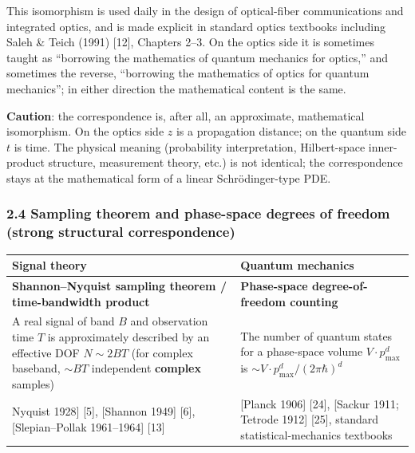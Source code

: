 \documentclass[
]{article}
\newcounter{none} %
\begin{document}
This isomorphism is used daily in the design of optical-fiber
communications and integrated optics, and is made explicit in standard
optics textbooks including Saleh \& Teich (1991) {[}12{]}, Chapters
2--3. On the optics side it is sometimes taught as ``borrowing the
mathematics of quantum mechanics for optics,'' and sometimes the
reverse, ``borrowing the mathematics of optics for quantum mechanics'';
in either direction the mathematical content is the same.

\textbf{Caution}: the correspondence is, after all, an approximate,
mathematical isomorphism. On the optics side \(z\) is a propagation
distance; on the quantum side \(t\) is time. The physical meaning
(probability interpretation, Hilbert-space inner-product structure,
measurement theory, etc.) is not identical; the correspondence stays at
the mathematical form of a linear Schrödinger-type PDE.

\subsubsection{2.4 Sampling theorem and phase-space degrees of freedom
(strong structural
correspondence)}\label{sampling-theorem-and-phase-space-degrees-of-freedom-strong-structural-correspondence}

{\def\LTcaptype{none} %
\begin{longtable}[]{@{}
  >{\raggedright\arraybackslash}p{}
  >{\raggedright\arraybackslash}p{}@{}}
\toprule\noalign{}
\begin{minipage}[b]{\linewidth}\raggedright
Signal theory
\end{minipage} & \begin{minipage}[b]{\linewidth}\raggedright
Quantum mechanics
\end{minipage} \\
\midrule\noalign{}
\endhead
\bottomrule\noalign{}
\endlastfoot
\textbf{Shannon--Nyquist sampling theorem / time-bandwidth product} &
\textbf{Phase-space degree-of-freedom counting} \\
A real signal of band \(B\) and observation time \(T\) is approximately
described by an effective DOF \(N\sim 2BT\) (for complex baseband,
\(\sim BT\) independent \textbf{complex} samples) & The number of
quantum states for a phase-space volume \(V\cdot p_{\max}^d\) is
\(\sim V\cdot p_{\max}^d/(2\pi\hbar)^d\) \\
{[}Nyquist 1928{]} {[}5{]}, {[}Shannon 1949{]} {[}6{]},
{[}Slepian--Pollak 1961--1964{]} {[}13{]} & {[}Planck 1906{]} {[}24{]},
{[}Sackur 1911; Tetrode 1912{]} {[}25{]}, standard statistical-mechanics
textbooks \\
\end{longtable}
}
\end{document}
